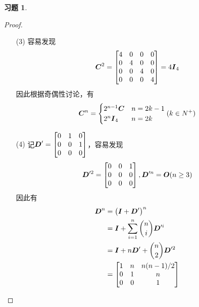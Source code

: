 \documentclass{ctexart}
\newtheorem{problem}{习题}[section]
\begin{document}
\begin{problem}
\end{problem}
\begin{proof}
    \begin{enumerate}

        \item[(3)]
            {
            容易发现
            \begin{equation*}
                \boldsymbol{C}^2=
                \begin{bmatrix}
                    4 & 0 & 0 & 0 \\
                    0 & 4 & 0 & 0 \\
                    0 & 0 & 4 & 0 \\
                    0 & 0 & 0 & 4
                \end{bmatrix}=4\boldsymbol{I}_4
            \end{equation*}
            因此根据奇偶性讨论，有
            \begin{equation*}
                \boldsymbol{C}^n=
                \begin{cases}
                    2^{n-1}\boldsymbol{C} & n=2k-1 \\
                    2^n\boldsymbol{I}_4   & n=2k
                \end{cases}
                (k\in N^+)
            \end{equation*}
            }

        \item[(4)]
            {
            记\(\boldsymbol{D}'=\begin{bmatrix}0&1&0\\0&0&1\\0&0&0\end{bmatrix}\)，容易发现
            \begin{equation*}
                \boldsymbol{D}'^2=\begin{bmatrix}0&0&1\\0&0&0\\0&0&0\end{bmatrix},\boldsymbol{D}'^n=\boldsymbol{O}(n\ge3)
            \end{equation*}
            因此有
            \begin{align*}
                \boldsymbol{D}^n & =\left( \boldsymbol{I}+\boldsymbol{D}' \right)^n                 \\
                        & =\boldsymbol{I}+\sum_{i=1}^n\binom{n}{i}\boldsymbol{D}'^i \\
                        & =\boldsymbol{I}+n\boldsymbol{D}'+\binom{n}{2}\boldsymbol{D}'^2     \\
                        & =\begin{bmatrix}
                    1 & n & n(n-1)/2 \\
                    0 & 1 & n        \\
                    0 & 0 & 1
                \end{bmatrix}
            \end{align*}
            }
    \end{enumerate}
\end{proof}
\end{document}
